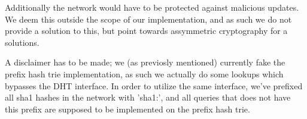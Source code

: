 Additionally the network would have to be protected against malicious updates.
We deem this outside the scope of our implementation, and as such we do not
provide a solution to this, but point towards assymmetric cryptography for a 
solutions.

A disclaimer has to be made; we (as previosly mentioned) currently fake the 
prefix hash trie implementation, as such we actually do some lookups which
bypasses the DHT interface. In order to utilize the same interface, we've
prefixed all sha1 hashes in the network with 'sha1:', and all queries that does
not have this prefix are supposed to be implemented on the prefix hash trie.
